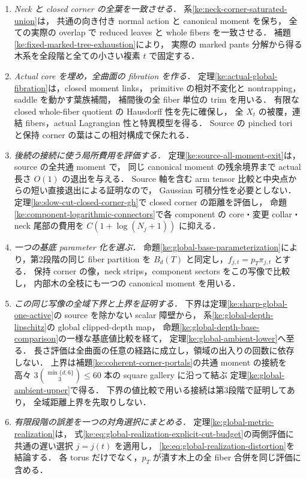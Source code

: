 \begin{enumerate}
\item \emph{Neck と closed corner の全葉を一致させる．}
系\ref{ke:neck-corner-saturated-union}は，
共通の向き付き normal action と canonical moment を保ち，
全ての実際の overlap で reduced leaves と whole fibers を一致させる．
補題\ref{ke:fixed-marked-tree-exhaustion}により，
実際の marked pants 分解から得る木系を全段階と全ての小さい複素 $t$ で固定する．

\item \emph{Actual core を埋め，全曲面の fibration を作る．}
定理\ref{ke:actual-global-fibration}は，closed moment links，
primitive の相対不変化と nontrapping，saddle を動かす葉族補間，
補間後の全 fiber 単位の trim を用いる．
有限な closed whole-fiber quotient の Hausdorff 性を先に確保し，
全 $X_t$ の被覆，連結 fibers，actual Lagrangian 性と特異模型を得る．
Source の pinched tori と保持 corner の葉はこの相対構成で保たれる．

\item \emph{後続の接続に使う局所費用を評価する．}
定理\ref{ke:source-all-moment-exit}は，source の全共通 moment で，
同じ canonical moment の残余境界まで actual 長さ $O(1)$ の退出を与える．
Source 軸を含む arm tensor 比較と中央点からの短い直接退出による証明なので，
Gaussian 可積分性を必要としない．
定理\ref{ke:slow-cut-closed-corner-gh}で closed corner の距離を評価し，
命題\ref{ke:component-logarithmic-connectors}で各 component の
core・変更 collar・neck 尾部の費用を $C(1+\log(N_j+1))$ に抑える．

\item \emph{一つの基底 parameter 化を選ぶ．}
命題\ref{ke:global-base-parameterization}により，第2段階の同じ fiber partition を
$B_d(T)$ と同定し，$f_{j,t}=p_T\pi_{j,t}$ とする．
保持 corner の像，neck strips，component sectors をこの写像で比較し，
内部木の全枝にも一つの canonical moment を用いる．

\item \emph{この同じ写像の全域下界と上界を証明する．}
下界は定理\ref{ke:sharp-global-one-active}の source を除かない scalar 障壁から，
系\ref{ke:global-depth-lipschitz}の global clipped-depth map，
命題\ref{ke:global-depth-base-comparison}の一様な基底値比較を経て，
定理\ref{ke:global-ambient-lower}へ至る．
長さ評価は全曲面の任意の経路に成立し，領域の出入りの回数に依存しない．
上界は補題\ref{ke:coherent-corner-portals}の共通 moment の接続を
高々 $3\binom{\min\{d,6\}}3\le60$ 本の square gallery に沿って結ぶ
定理\ref{ke:global-ambient-upper}で得る．
下界の値比較で用いる接続は第3段階で証明してあり，
全域距離上界を先取りしない．

\item \emph{有限段階の誤差を一つの対角選択にまとめる．}
定理\ref{ke:global-metric-realization}は，
式\eqref{ke:eq:global-realization-explicit-cut-budget}の両側評価に
共通の遅い選択 $j=j(t)$ を適用し，
\eqref{ke:eq:global-realization-distortion}を結論する．
各 torus だけでなく，$p_T$ が潰す木上の全 fiber 合併を同じ評価に含める．
\end{enumerate}

